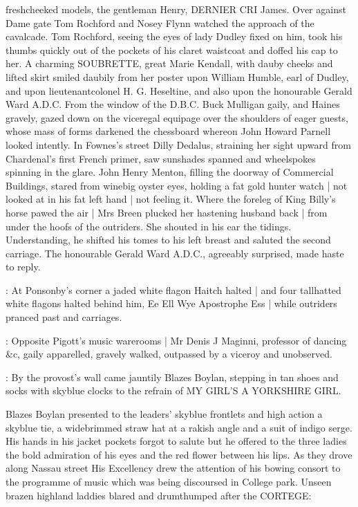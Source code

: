 freshcheeked models,
the gentleman Henry,
DERNIER CRI James.
Over against Dame gate
Tom Rochford and Nosey Flynn
watched the approach of the cavalcade.
Tom Rochford,
seeing the eyes of lady Dudley fixed on him,
took his thumbs quickly
out of the pockets of his claret waistcoat and
doffed his cap to her.
A charming SOUBRETTE, great Marie Kendall,
with dauby cheeks and lifted skirt
smiled daubily from her poster
upon William Humble, earl of Dudley,
and upon lieutenantcolonel H. G. Heseltine,
and also upon the honourable Gerald Ward A.D.C.
From the window of the D.B.C.
Buck Mulligan gaily,
and Haines gravely,
gazed down on the
viceregal equipage
over the shoulders of eager guests,
whose mass of forms
darkened the chessboard
whereon John Howard Parnell looked intently.
In Fownes's street
Dilly Dedalus,
straining her sight upward from
Chardenal's first French primer,
saw sunshades spanned and wheelspokes
spinning in the glare.
John Henry Menton,
filling the doorway of Commercial Buildings,
stared from winebig oyster eyes,
holding a fat gold hunter watch |
not looked at in his fat left hand |
not feeling it.
Where the foreleg of King Billy's horse pawed the air |
Mrs Breen plucked her hastening husband back |
from under the hoofs of the outriders.
She shouted in his ear
the tidings.
Understanding, he shifted his tomes to his left
breast
and saluted the second carriage.
The honourable Gerald Ward A.D.C.,
agreeably surprised,
made haste to reply.

:
At Ponsonby's corner
a jaded
white flagon Haitch \stage{[H.]} halted |
and four tallhatted white flagons halted behind him,
Ee Ell Wye Apostrophe Ess \stage{[E.L.Y.'S]} |
while outriders pranced past
and carriages.

:
Opposite Pigott's music warerooms |
Mr Denis J Maginni,
professor of dancing \&c,
gaily apparelled,
gravely walked,
outpassed by a viceroy and unobserved.

:
By the provost's wall
came jauntily Blazes Boylan,
stepping in tan shoes
and socks with skyblue clocks
to the refrain of
MY GIRL'S A YORKSHIRE GIRL.

Blazes Boylan presented to the leaders'
skyblue frontlets and high
action a skyblue tie,
a widebrimmed straw hat at a rakish angle
and a suit
of indigo serge.
His hands in his jacket pockets
forgot to salute but he
offered to the three ladies
the bold admiration of his eyes
and the red
flower between his lips.
As they drove along Nassau street
His Excellency
drew the attention of his bowing consort
to the programme of music
which
was being discoursed in College park.
Unseen brazen highland laddies
blared and drumthumped
after the CORTEGE:%


